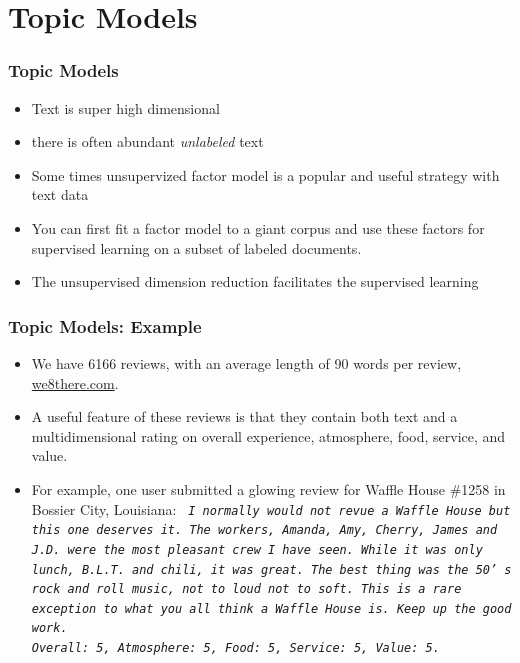 \documentclass[
  shownotes,
  xcolor={svgnames},
  hyperref={colorlinks,citecolor=DarkBlue,linkcolor=DarkRed,urlcolor=DarkBlue}
  , aspectratio=169]{beamer}
\begin{document}
\section{Topic Models}
\begin{frame}
\frametitle{Topic Models}

\begin{itemize}
\item Text is super high dimensional
\medskip
\item there is often abundant {\it unlabeled} text
\medskip
\item Some times unsupervized factor model is a popular and useful strategy with text data
\medskip
\item You can first fit a factor model to a giant corpus and use these factors for supervised learning on a subset of labeled documents.
\medskip
\item The unsupervised dimension reduction facilitates the supervised learning
\end{itemize}
\end{frame}
\begin{frame}
\frametitle{Topic Models: Example}

\begin{itemize}


\item We have 6166 reviews, with an average length of 90 words per review, \url{we8there.com}. 
\medskip
\item A useful feature of these reviews is that they contain both text and a multidimensional rating on overall experience, atmosphere, food, service, and value. 
\medskip
\item For example, one user submitted a glowing review for Waffle House \#1258 in Bossier City, Louisiana: 
\medskip
{\tt \it 
I normally would not revue a Waffle House but this one deserves it. The workers, Amanda, Amy, Cherry, James and J.D. were the most pleasant crew I have seen. While it was only lunch, B.L.T. and chili, it was great. The best thing was the 50’ s rock and roll music, not to loud not to soft. This is a rare exception to what you all think a Waffle House is. Keep up the good work. \\
Overall: 5, Atmosphere: 5, Food: 5, Service: 5, Value: 5. 
}
\end{itemize}
\end{frame}
\end{document}
